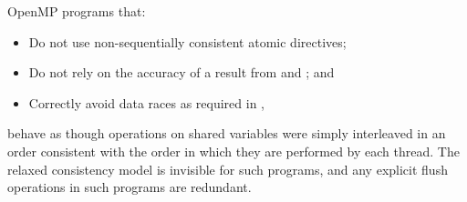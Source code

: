 OpenMP programs that:

\begin{itemize}[rightmargin=11ex]
\item Do not use non-sequentially consistent atomic directives;
\item Do not rely on the accuracy of a  result from
       and ; and
\item Correctly avoid data races as required in 
      ,
\end{itemize}

behave as though operations on shared variables were simply interleaved 
in an order consistent with the order in which they are performed by 
each thread. The relaxed consistency model is invisible for such programs, 
and any explicit flush operations in such programs are redundant.
